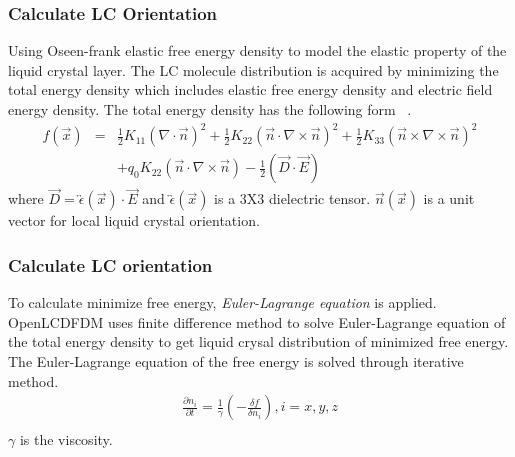 \documentclass{beamer}
\begin{document}
\begin{frame}
\frametitle{Calculate LC Orientation}
Using Oseen-frank elastic free energy density to model the elastic property of the liquid crystal layer.
The LC molecule distribution is acquired by minimizing the total energy density which includes elastic free energy density and electric field energy density.
The total energy density has the following form ~\cite{ShinTson}.
\begin{eqnarray}
f(\vec x) &=& \frac{1}{2}K_{11}(\nabla\cdot\vec n)^2+\frac{1}{2}K_{22}(\vec n\cdot\nabla\times\vec n)^2 + \frac{1}{2}K_{33}(\vec n\times\nabla\times\vec n)^2\nonumber \\
&&+q_0K_{22}(\vec n\cdot\nabla\times\vec n) - \frac{1}{2}(\vec D\cdot\vec E)\nonumber
\label{eq:free_energy}
\end{eqnarray}
where $\vec D = \overleftrightarrow{\epsilon}(\vec x)\cdot \vec E$ and $\overleftrightarrow{\epsilon}(\vec x)$ is a 3X3 dielectric tensor. $\vec n(\vec{x})$ is a unit vector for local liquid crystal orientation.
\end{frame}
\begin{frame}
\frametitle{Calculate LC orientation}
To calculate minimize free energy, \emph{Euler-Lagrange equation} is applied. OpenLCDFDM uses finite difference method to solve Euler-Lagrange equation of the total energy density to get liquid crysal distribution of minimized free energy.\\
The Euler-Lagrange equation of the free energy is solved through iterative method.
\begin{eqnarray}
\frac{\partial n_i}{\partial t} = \frac{1}{\gamma} \left( -\frac{\delta f}{\delta n_i} \right), i = x, y, z \\ \nonumber
\end{eqnarray}
$\gamma$ is the viscosity.
\end{frame}
\end{document}

